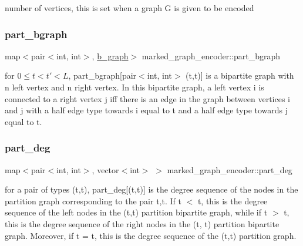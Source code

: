 number of vertices, this is set when a graph G is given to be encoded 

\mbox{\label{classmarked__graph__encoder_a5faebef707fb681c0b6c2ccf64abc04c}} 
\subsubsection{\texorpdfstring{part\+\_\+bgraph}{part\_bgraph}}
{\footnotesize\ttfamily map$<$pair$<$int, int$>$, \hyperlink{classb__graph}{b\+\_\+graph}$>$ marked\+\_\+graph\+\_\+encoder\+::part\+\_\+bgraph\hspace{0.3cm}{\ttfamily [private]}}



for $0 \leq t < t' < L$, part\+\_\+bgraph\mbox{[}pair$<$int, int$>$ (t,t\textquotesingle{})\mbox{]} is a bipartite graph with n left vertex and n right vertex. In this bipartite graph, a left vertex i is connected to a right vertex j iff there is an edge in the graph between vertices i and j with a half edge type towards i equal to t and a half edge type towards j equal to t\textquotesingle{}. 

\mbox{\label{classmarked__graph__encoder_a55ea2edb2609dfc287432f61900d6ad1}} 
\subsubsection{\texorpdfstring{part\+\_\+deg}{part\_deg}}
{\footnotesize\ttfamily map$<$pair$<$int, int$>$, vector$<$int$>$ $>$ marked\+\_\+graph\+\_\+encoder\+::part\+\_\+deg\hspace{0.3cm}{\ttfamily [private]}}



for a pair of types (t,t\textquotesingle{}), part\+\_\+deg\mbox{[}(t,t\textquotesingle{})\mbox{]} is the degree sequence of the nodes in the partition graph corresponding to the pair t,t\textquotesingle{}. If t $<$ t\textquotesingle{}, this is the degree sequence of the left nodes in the (t,t\textquotesingle{}) partition bipartite graph, while if t $>$ t\textquotesingle{}, this is the degree sequence of the right nodes in the (t\textquotesingle{}, t) partition bipartite graph. Moreover, if t = t\textquotesingle{}, this is the degree sequence of the (t,t) partition graph. 

